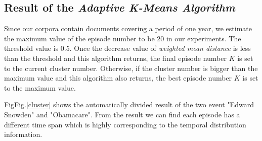 \documentclass[runningheads,a4paper]{llncs}
\begin{document}
\subsection{Result of the \emph{Adaptive K-Means Algorithm}}
\label{section5.1}
Since our corpora contain documents covering a period of one year, we estimate the maximum value of the episode number to be 20 in our experiments. The threshold value is 0.5. Once the decrease value of \emph{weighted mean distance} is less than the threshold and this algorithm returns, the final episode number $K$ is set to the current cluster number. Otherwise, if the cluster number is bigger than the maximum value and this algorithm also returns, the best episode number $K$ is set to the maximum value.

FigFig.\ref{cluster} shows the automatically divided result of the two event "Edward Snowden" and "Obamacare". From the result we can find each episode has a different time span which is highly corresponding to the temporal distribution information.
\end{document}
